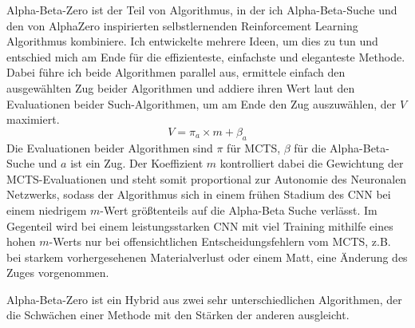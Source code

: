 \documentclass{jpp}
\begin{document}
Alpha-Beta-Zero ist der Teil von Algorithmus, in der ich Alpha-Beta-Suche und den von AlphaZero inspirierten selbstlernenden Reinforcement Learning Algorithmus kombiniere. Ich entwickelte mehrere Ideen, um dies zu tun und entschied mich am Ende für die effizienteste, einfachste und eleganteste Methode. Dabei führe ich beide Algorithmen parallel aus, ermittele einfach den ausgewählten Zug beider Algorithmen und addiere ihren Wert laut den Evaluationen beider Such-Algorithmen, um am Ende den Zug auszuwählen, der $V$ maximiert.
\begin{equation}
    V = \pi_a \times m + \beta_a
\end{equation}
Die Evaluationen beider Algorithmen sind $\pi$ für MCTS, $\beta$ für die Alpha-Beta-Suche und $a$ ist ein Zug. Der Koeffizient $m$ kontrolliert dabei die Gewichtung der MCTS-Evaluationen und steht somit proportional zur Autonomie des Neuronalen Netzwerks, sodass der Algorithmus sich in einem frühen Stadium des CNN bei einem niedrigem $m$-Wert größtenteils auf die Alpha-Beta Suche verlässt. Im Gegenteil wird bei einem leistungsstarken CNN mit viel Training mithilfe eines hohen $m$-Werts nur bei offensichtlichen Entscheidungsfehlern vom MCTS, z.B. bei starkem vorhergesehenen Materialverlust oder einem Matt, eine Änderung des Zuges vorgenommen. 

Alpha-Beta-Zero ist ein Hybrid aus zwei sehr unterschiedlichen Algorithmen, der die Schwächen einer Methode mit den Stärken der anderen ausgleicht. 
\end{document}
